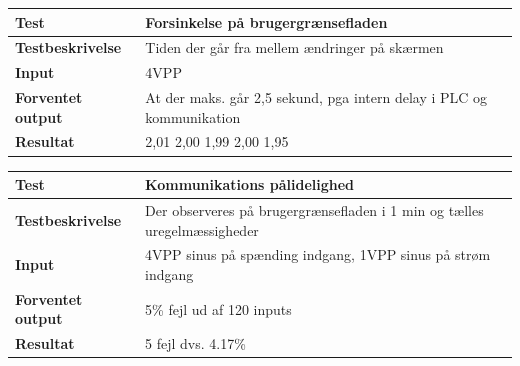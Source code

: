 \begin{center}
	\begin{tabular}{ | m{} | m{}|} 
		\hline
		\textbf{Test}					&Forsinkelse på brugergrænsefladen \\ \hline
		\textbf{Testbeskrivelse}		&Tiden der går fra mellem ændringer på skærmen \\ \hline
		\textbf{Input}					&4VPP \\ \hline
		\textbf{Forventet output}		&At der maks. går 2,5 sekund, pga intern delay i PLC og kommunikation \\ \hline
		\textbf{Resultat}				&2,01 2,00 1,99 2,00 1,95   \\ \hline
	\end{tabular}
\end{center}


\begin{center}
	\begin{tabular}{ | m{} | m{}|} 
		\hline
		\textbf{Test}					&Kommunikations pålidelighed \\ \hline
		\textbf{Testbeskrivelse}		&Der observeres på brugergrænsefladen i 1 min og tælles uregelmæssigheder \\ \hline
		\textbf{Input}					&4VPP sinus på spænding indgang, 1VPP sinus på strøm indgang\\ \hline
		\textbf{Forventet output}		&5\% fejl ud af 120 inputs \\ \hline
		\textbf{Resultat}				&5 fejl dvs. 4.17\%  \\ \hline
	\end{tabular}
\end{center}
